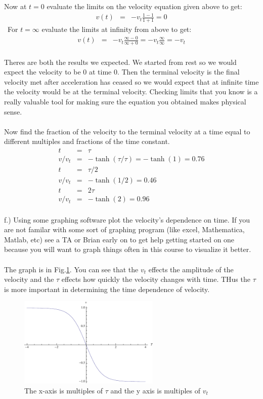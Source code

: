 \documentclass[11pt]{amsart}
\begin{document}
Now at $t=0$ evaluate the limits on the velocity equation given above to get: \\ 
\begin{eqnarray*}
v(t) &=&-v_{t}\frac{1-1}{1+1} = 0 
\end{eqnarray*} \
For $t=\infty$ evaluate the limits at infinity from above to get: \\ 
\begin{eqnarray*}
v(t) &=& -v_{t}\frac{\infty - 0}{\infty + 0} = -v_{t}\frac{\infty}{\infty} = -v_{t} 
\end{eqnarray*} \\
Theres are both the results we expected. We started from rest so we would expect the velocity to be 0 at time 0. Then the terminal velocity is the final velocity met after acceleration has ceased so we would expect that at infinite time the velocity would be at the terminal velocity. Checking limits that you know is a really valuable tool for making sure the equation you obtained makes physical sense. \\ \\
Now find the fraction of the velocity to the terminal velocity at a time equal to different multiples and fractions of the time constant. \\ 
\begin{eqnarray*} 
t &=& \tau \\
v/v_{t} &=& -\tanh(\tau/\tau) = -\tanh(1) = 0.76 \\
t &=& \tau/2 \\
v/v_{t} &=& -\tanh(1/2) = 0.46 \\
t &=& 2\tau \\
v/v_{t} &=& -\tanh(2) = 0.96 
\end{eqnarray*} \\
f.) Using some graphing software plot the velocity's dependence on time. If you are not familar with some sort of graphing program (like excel, Mathematica, Matlab, etc) see a TA or Brian early on to get help getting started on one because you will want to graph things often in this course to visualize it better. \\  \\
The graph is in Fig.\ref{tanh}. You can see that the $v_{t}$ effects the amplitude of the velocity and the $\tau$ effects how quickly the velocity changes with time. THus the $\tau$ is more important in determining the time dependence of velocity. \\
\begin{figure}[htb]
\includegraphics[width=0.6\textwidth]{tanh.pdf}
\caption{The x-axis is multiples of $\tau$ and the y axis is multiples of $v_{t}$}
\label{tanh}
\end{figure}
\end{document}
